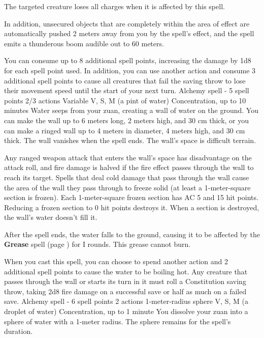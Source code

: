     The targeted creature loses all charges when it is affected by this spell.

    In addition, unsecured objects that are completely within the area of effect are automatically pushed 2 meters away from you by the spell's effect, and the spell emits a thunderous boom audible out to 60 meters.

    You can consume up to 8 additional spell points, increasing the damage by 1d8 for each spell point used.
    In addition, you can use another action and consume 3 additional spell points to cause all creatures that fail the saving throw to lose their movement speed until the start of your next turn.
    {Alchemy spell - 5 spell points}
    {2/3 actions}
    {Variable}
    {V, S, M (a pint of water)}
    {Concentration, up to 10 minutes}
    Water seeps from your zuan, creating a wall of water on the ground.
    You can make the wall up to 6 meters long, 2 meters high, and 30 cm thick, or you can make a ringed wall up to 4 meters in diameter, 4 meters high, and 30 cm thick.
    The wall vanishes when the spell ends.
    The wall's space is difficult terrain.

    Any ranged weapon attack that enters the wall's space has disadvantage on the attack roll, and fire damage is halved if the fire effect passes through the wall to reach its target.
    Spells that deal cold damage that pass through the wall cause the area of the wall they pass through to freeze solid (at least a 1-meter-square section is frozen).
    Each 1-meter-square frozen section has AC 5 and 15 hit points.
    Reducing a frozen section to 0 hit points destroys it.
    When a section is destroyed, the wall's water doesn't fill it.

    After the spell ends, the water falls to the ground, causing it to be affected by the \textbf{Grease} spell (page \pageref{spell::grease}) for I rounds.
    This grease cannot burn.

    When you cast this spell, you can choose to spend another action and 2 additional spell points to cause the water to be boiling hot.
    Any creature that passes through the wall or starts its turn in it must roll a Constitution saving throw, taking 2d8 fire damage on a successful save or half as much on a failed save.
    {Alchemy spell - 6 spell points}
    {2 actions}
    {1-meter-radius sphere}
    {V, S, M (a droplet of water)}
    {Concentration, up to 1 minute}
    You dissolve your zuan into a sphere of water with a 1-meter radius.
    The sphere remains for the spell's duration.

